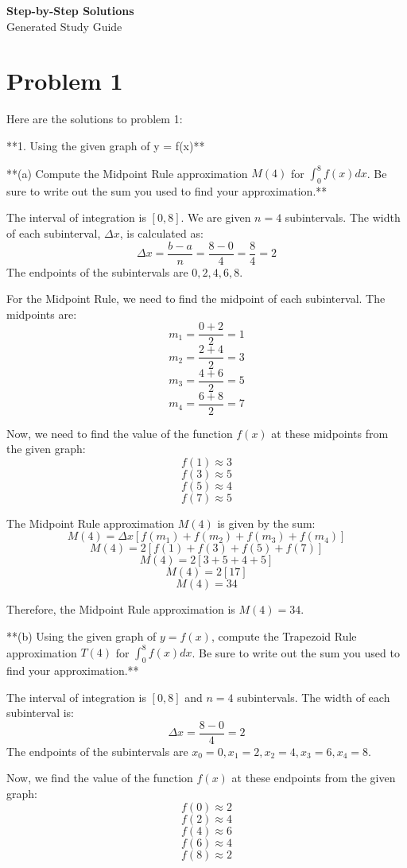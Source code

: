 \documentclass{article}
\begin{document}
\begin{center}
    \huge \textbf{Step-by-Step Solutions} \\
    \large Generated Study Guide
\end{center}
\vspace{20pt}
\section*{Problem 1}
Here are the solutions to problem 1:

**1. Using the given graph of y = f(x)**

**(a) Compute the Midpoint Rule approximation $M(4)$ for $\int_{0}^{8} f(x)dx$. Be sure to write out the sum you used to find your approximation.**

The interval of integration is $[0, 8]$. We are given $n=4$ subintervals.
The width of each subinterval, $\Delta x$, is calculated as:
$$ \Delta x = \frac{b - a}{n} = \frac{8 - 0}{4} = \frac{8}{4} = 2 $$
The endpoints of the subintervals are $0, 2, 4, 6, 8$.

For the Midpoint Rule, we need to find the midpoint of each subinterval. The midpoints are:
$$ m_1 = \frac{0 + 2}{2} = 1 $$
$$ m_2 = \frac{2 + 4}{2} = 3 $$
$$ m_3 = \frac{4 + 6}{2} = 5 $$
$$ m_4 = \frac{6 + 8}{2} = 7 $$

Now, we need to find the value of the function $f(x)$ at these midpoints from the given graph:
$$ f(1) \approx 3 $$
$$ f(3) \approx 5 $$
$$ f(5) \approx 4 $$
$$ f(7) \approx 5 $$

The Midpoint Rule approximation $M(4)$ is given by the sum:
$$ M(4) = \Delta x [f(m_1) + f(m_2) + f(m_3) + f(m_4)] $$
$$ M(4) = 2 [f(1) + f(3) + f(5) + f(7)] $$
$$ M(4) = 2 [3 + 5 + 4 + 5] $$
$$ M(4) = 2 [17] $$
$$ M(4) = 34 $$

Therefore, the Midpoint Rule approximation is $M(4) = 34$.

**(b) Using the given graph of $y = f(x)$, compute the Trapezoid Rule approximation $T(4)$ for $\int_{0}^{8} f(x)dx$. Be sure to write out the sum you used to find your approximation.**

The interval of integration is $[0, 8]$ and $n=4$ subintervals.
The width of each subinterval is:
$$ \Delta x = \frac{8 - 0}{4} = 2 $$
The endpoints of the subintervals are $x_0 = 0, x_1 = 2, x_2 = 4, x_3 = 6, x_4 = 8$.

Now, we find the value of the function $f(x)$ at these endpoints from the given graph:
$$ f(0) \approx 2 $$
$$ f(2) \approx 4 $$
$$ f(4) \approx 6 $$
$$ f(6) \approx 4 $$
$$ f(8) \approx 2 $$
\end{document}
